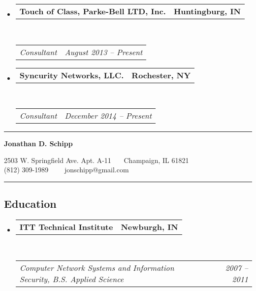 \documentclass[10pt,letterpaper]{article}
\makeatletter
\newcommand{\headerrow}[2]
{\begin{tabular*}{\linewidth}{l@{\extracolsep{\fill}}r}
	#1 &
	#2 \\
\end{tabular*}}
\makeatother
\begin{document}
\begin{itemize}
\item
	\headerrow
		{\textbf{Touch of Class, Parke-Bell LTD, Inc.}}
		{\textbf{Huntingburg, IN}}
	\\
	\headerrow
		{\emph{Consultant}}
		{\emph{August 2013 -- Present}}
\end{itemize}

\begin{itemize}
\item
	\headerrow
		{\textbf{Syncurity Networks, LLC.}}
		{\textbf{Rochester, NY}}
	\\
	\headerrow
		{\emph{Consultant}}
		{\emph{December 2014 -- Present}}
\end{itemize}

\hrule

\newpage

\begin{center}
{\LARGE \textbf{Jonathan D. Schipp}}

2503 W. Springfield Ave. Apt. A-11\ \textbullet
\ \ Champaign, IL 61821
\\
(812) 309-1989\ \ \textbullet
\ \ jonschipp@gmail.com
\end{center}

\hrule
\vspace{-0.4em}
\subsection*{Education}

\begin{itemize}
	\parskip=0.1em

	\item
	\headerrow
		{\textbf{ITT Technical Institute}}
		{\textbf{Newburgh, IN}}
	\\
	\headerrow
		{\emph{Computer Network Systems and Information Security, B.S. Applied Science}}
		{\emph{2007 -- 2011}}

\end{itemize}
\end{document}
